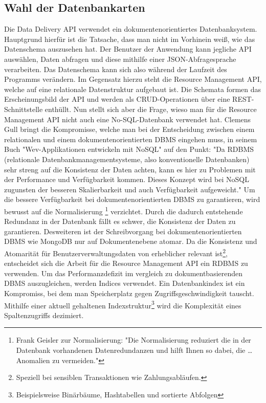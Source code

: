 \subsection{Wahl der Datenbankarten}
\label{subsec:wahlderdatenbankarten}
Die Data Delivery API verwendet ein dokumentenorientiertes Datenbanksystem.
Hauptgrund hierfür ist die Tatsache, dass man nicht im Vorhinein weiß, wie das
Datenschema auszusehen hat. Der Benutzer der Anwendung kann jegliche API
auswählen, Daten abfragen und diese mithilfe einer JSON-Abfragesprache verarbeiten. Das Datenschema
kann sich also während der Laufzeit des Programms verändern. Im Gegensatz hierzu steht die Resource
Management API, welche auf eine relationale Datenstruktur aufgebaut ist. Die Schemata formen das
Erscheinungsbild der API und werden als CRUD-Operationen über eine REST-Schnittstelle enthüllt.
Nun stellt sich aber die Frage, wieso man für die Resource Management API nicht auch eine
No-SQL-Datenbank verwendet hat. Clemens Gull bringt die Kompromisse, welche man bei der
Entscheidung zwischen einem relationalen und einem dokumentenorientierten DBMS
eingehen muss, in seinem Buch "Wev-Applikationen entwickeln mit NoSQL" auf den Punkt:
"Da RDBMS (relationale Datenbankmanagementsysteme, also konventionelle Datenbanken) sehr streng
auf die Konsistenz der Daten achten, kann es hier zu Problemen mit der Performance und Verfügbarkeit
kommen. Dieses Konzept wird bei NoSQL zugunsten der besseren Skalierbarkeit und auch Verfügbarkeit
aufgeweicht."\cite[S. 18]{NoSQLClemensGull} Um die bessere Verfügbarkeit bei dokumentenorientierten
DBMS zu garantieren, wird bewusst auf die Normalisierung
\footnote{Frank Geisler zur Normalisierung: "Die Normalisierung reduziert die in der Datenbank vorhandenen Datenredundanzen und hilft Ihnen so dabei, die \dots Anomalien zu vermeiden."\cite[S. 177]{DatenbankenFrankGeisler}}
verzichtet. Durch die dadurch entstehende Redundanz in der Datenbank fällt es schwer,
die Konsistenz der Daten zu garantieren. Desweiteren ist der Schreibvorgang bei dokumentenorientierten
DBMS wie MongoDB nur auf Dokumentenebene atomar.\cite{MongoDBAtomaritaet} Da die Konsistenz und Atomarität für
Benutzerverwaltungsdaten von erheblicher relevant ist\footnote{Speziell bei sensiblen Transaktionen wie Zahlungsabläufen.}, 
entscheidet sich die Arbeit für die Resource Management API ein RDBMS zu verwenden.
Um das Performanzdefizit im vergleich zu dokumentbasierenden DBMS auszugleichen,
werden Indices verwendet. Ein Datenbankindex ist ein Kompromiss, bei dem
man Speicherplatz gegen Zugriffsgeschwindigkeit tauscht.\cite{YoutubePostgresIndexing}
Mithilfe einer aktuell gehaltenen Indexstruktur\footnote{Beispielsweise Binärbäume, Hashtabellen und sortierte Abfolgen}
wird die Komplexität eines Spaltenzugriffs dezimiert.

